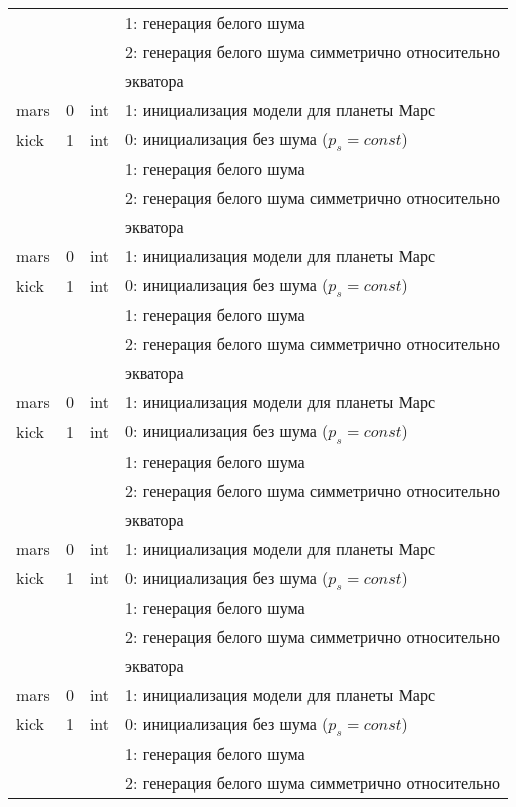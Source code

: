 \begin{longtable}[c]{|l|c|l|l|}
      &   &     & 1: генерация белого шума                  \\
      &   &     & 2: генерация белого шума симметрично относительно \\
  & & & экватора    \\
 mars & 0 & int & 1: инициализация модели для планеты Марс     \\
kick & 1 & int & 0: инициализация без шума ($p_s = const$) \\
      &   &     & 1: генерация белого шума                  \\
      &   &     & 2: генерация белого шума симметрично относительно \\
  & & & экватора    \\
 mars & 0 & int & 1: инициализация модели для планеты Марс     \\
kick & 1 & int & 0: инициализация без шума ($p_s = const$) \\
      &   &     & 1: генерация белого шума                  \\
      &   &     & 2: генерация белого шума симметрично относительно \\
  & & & экватора    \\
 mars & 0 & int & 1: инициализация модели для планеты Марс     \\
kick & 1 & int & 0: инициализация без шума ($p_s = const$) \\
      &   &     & 1: генерация белого шума                  \\
      &   &     & 2: генерация белого шума симметрично относительно \\
  & & & экватора    \\
 mars & 0 & int & 1: инициализация модели для планеты Марс     \\
kick & 1 & int & 0: инициализация без шума ($p_s = const$) \\
      &   &     & 1: генерация белого шума                  \\
      &   &     & 2: генерация белого шума симметрично относительно \\
  & & & экватора    \\
 mars & 0 & int & 1: инициализация модели для планеты Марс     \\
kick & 1 & int & 0: инициализация без шума ($p_s = const$) \\
      &   &     & 1: генерация белого шума                  \\
      &   &     & 2: генерация белого шума симметрично относительно \\

\end{longtable}
